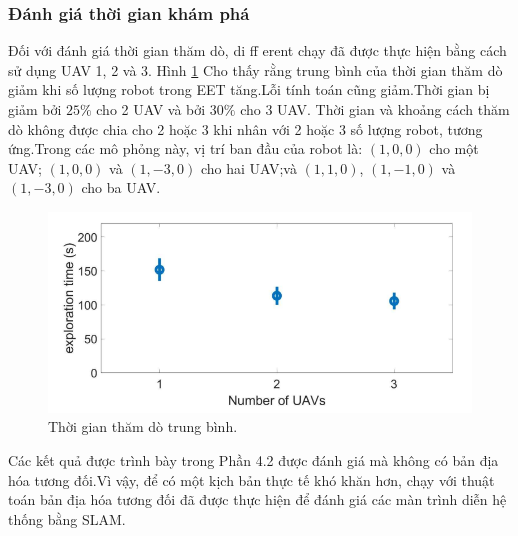 \documentclass[11pt,openany]{book}
\begin{document}
\begin{algorimth}[H]
\subsubsection{Đánh giá thời gian khám phá}
Đối với đánh giá thời gian thăm dò, di ff erent chạy đã được thực hiện bằng cách sử dụng UAV 1, 2 và 3. Hình \ref{fig:3.22} Cho thấy rằng trung bình của thời gian thăm dò giảm khi số lượng robot trong EET tăng.Lỗi tính toán cũng giảm.Thời gian bị giảm bởi $25\%$ cho 2 UAV và bởi $30\%$ cho 3 UAV. Thời gian và khoảng cách thăm dò không được chia cho 2 hoặc 3 khi nhân với 2 hoặc 3 số lượng robot, tương ứng.Trong các mô phỏng này, vị trí ban đầu của robot là: $(1,0,0)$ cho một UAV; $(1,0,0)$ và $(1,-3,0)$ cho hai UAV;và $(1,1,0)$, $(1,-1,0)$ và $(1,-3,0)$ cho ba UAV.
\begin{figure}[H]
    \centering
    \includegraphics[tỉ lệ=0.4]{assets/3_22.png}
    \caption{Thời gian thăm dò trung bình.}
    \label{fig:3.22}
\end{figure}
Các kết quả được trình bày trong Phần 4.2 được đánh giá mà không có bản địa hóa tương đối.Vì vậy, để có một kịch bản thực tế khó khăn hơn, chạy với thuật toán bản địa hóa tương đối đã được thực hiện để đánh giá các màn trình diễn hệ thống bằng SLAM.

\end{algorimth}
\end{document}
